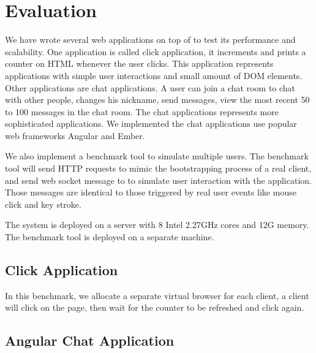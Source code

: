 \section{Evaluation}
\label{sec:eval}
We have wrote several web applications on top of \cb{} to test its
performance and scalability.
One application is called click application,
it increments and prints a counter on HTML whenever the user clicks.
This application represents applications with simple user interactions and small amount of DOM elements.
Other applications are chat applications.
A user can join a chat room to chat with other people,
changes his nickname, send messages, view the most recent 50 to 100 messages in the chat room.
The chat applications represents more sophisticated applications.
We implemented the chat applications use popular web frameworks Angular and Ember.

We also implement a benchmark tool to simulate multiple users.
The benchmark tool will send HTTP requests to mimic the bootstrapping process of a real client,
and send web socket message to \cb{} to simulate user interaction with the application.
Those messages are identical to those triggered by real user events like mouse click and key stroke.

The \cb{} system is deployed on a server with 8 Intel 2.27GHz cores and 12G memory.
The benchmark tool is deployed on a separate machine.

\subsection{Click Application}
In this benchmark,
we allocate a separate virtual browser for each client,
a client will click on the page, then wait for the counter to be refreshed and click again.


\subsection{Angular Chat Application}


\subsection{}